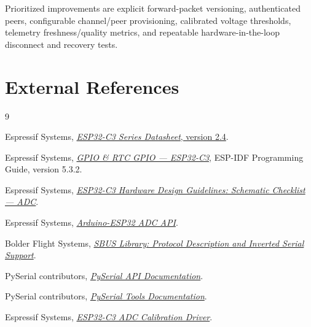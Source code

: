 \documentclass[11pt,a4paper]{article}
\begin{document}
Prioritized improvements are explicit forward-packet versioning,
authenticated peers, configurable channel/peer provisioning,
calibrated voltage thresholds, telemetry freshness/quality metrics, and
repeatable hardware-in-the-loop disconnect and recovery tests.

\section{External References}

\begin{thebibliography}{9}

Espressif Systems,
\href{https://documentation.espressif.com/esp32-c3_datasheet_en.pdf}
     {\emph{ESP32-C3 Series Datasheet}, version 2.4}.

Espressif Systems,
\href{https://docs.espressif.com/projects/esp-idf/en/v5.3.2/esp32c3/api-reference/peripherals/gpio.html}
     {\emph{GPIO \& RTC GPIO --- ESP32-C3}},
ESP-IDF Programming Guide, version 5.3.2.

Espressif Systems,
\href{https://docs.espressif.com/projects/esp-hardware-design-guidelines/en/latest/esp32c3/schematic-checklist.html\#adc}
     {\emph{ESP32-C3 Hardware Design Guidelines: Schematic Checklist --- ADC}}.

Espressif Systems,
\href{https://docs.espressif.com/projects/arduino-esp32/en/latest/api/adc.html}
     {\emph{Arduino-ESP32 ADC API}}.

Bolder Flight Systems,
\href{https://github.com/bolderflight/sbus\#description}
     {\emph{SBUS Library: Protocol Description and Inverted Serial Support}}.

PySerial contributors,
\href{https://pyserial.readthedocs.io/en/stable/pyserial.html}
     {\emph{PySerial API Documentation}}.

PySerial contributors,
\href{https://pyserial.readthedocs.io/en/latest/tools.html}
     {\emph{PySerial Tools Documentation}}.

Espressif Systems,
\href{https://docs.espressif.com/projects/esp-idf/en/latest/esp32c3/api-reference/peripherals/adc/adc_calibration.html}
     {\emph{ESP32-C3 ADC Calibration Driver}}.

\end{thebibliography}
\end{document}
